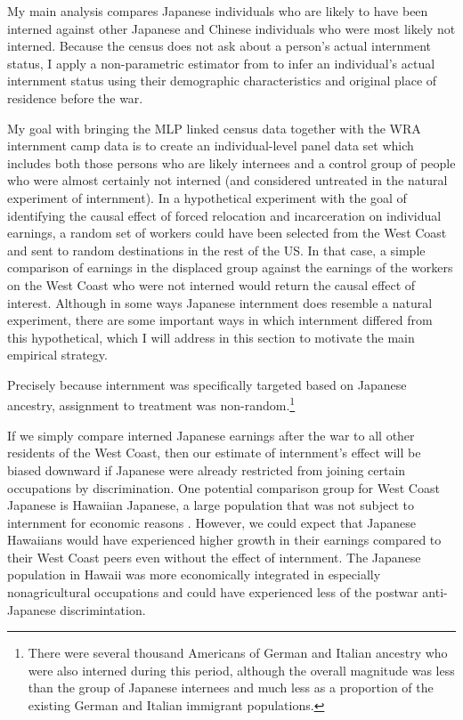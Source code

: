 \documentclass[12pt]{article}
\begin{document}
My main analysis compares Japanese individuals who are likely to have been interned
against other Japanese and Chinese individuals who were most likely not interned.
Because the census does not ask about a person's actual internment status,
I apply a non-parametric estimator from \citep{arellano-boverDisplacementDiversityMobility2022} to infer an individual's actual internment status using their demographic characteristics and original place of residence before the war.

My goal with bringing the MLP linked census data
together with the WRA internment camp data
is to create an individual-level panel data set
which includes both those persons who are likely internees
and a control group of people who were almost certainly not interned
(and considered untreated in the natural experiment of internment).
In a hypothetical experiment with the goal of identifying the causal effect
of forced relocation and incarceration on individual earnings,
a random set of workers could have been selected from the West Coast
and sent to random destinations in the rest of the US.
In that case, a simple comparison of earnings in the displaced group
against the earnings of the workers on the West Coast who were not interned
would return the causal effect of interest.
Although in some ways Japanese internment does resemble a natural experiment,
there are some important ways in which internment differed from this hypothetical,
which I will address in this section to motivate the main empirical strategy.

Precisely because internment was specifically targeted based on Japanese ancestry,
assignment to treatment was non-random.\footnote{There were several thousand Americans of German and Italian ancestry who were also interned during this period, although the overall magnitude was less than the group of Japanese internees and much less as a proportion of the existing German and Italian immigrant populations.}

If we simply compare interned Japanese earnings after the war
to all other residents of the West Coast,
then our estimate of internment's effect
will be biased downward if Japanese were already restricted from
joining certain occupations by discrimination.
One potential comparison group for  West Coast Japanese is Hawaiian Japanese,
a large population that was not subject to internment
for economic reasons \citep{chinLongRunLaborMarket2005}.
However, we could expect that Japanese Hawaiians
would have experienced higher growth in their earnings
compared to their West Coast peers even without the effect of internment.
The Japanese population in Hawaii was more economically integrated
in especially nonagricultural occupations
and could have experienced less of the postwar anti-Japanese discrimintation.
\end{document}
